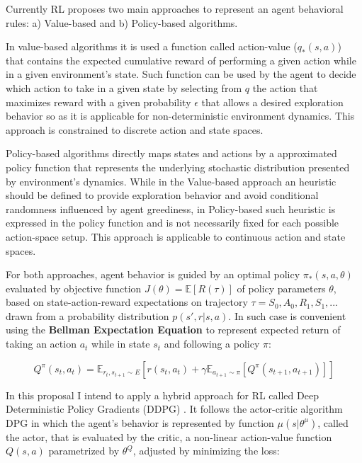 \documentclass[peerreview,onecolumn]{IEEEtran}
\begin{document}
 Currently RL proposes two main approaches to represent an agent behavioral rules: a) Value-based and b) Policy-based algorithms. 
 
 In value-based algorithms it is used a function called action-value ($q_*(s,a)$) that contains the expected cumulative reward of performing a given action while in a given environment's state. Such function can be used by the agent to decide which action to take in a given state by selecting from $q$ the action that maximizes reward with a given probability $\epsilon$ that allows a desired exploration behavior so as it is applicable for non-deterministic environment dynamics. This approach is constrained to discrete action and state spaces.
 
 Policy-based algorithms directly maps states and actions by a approximated policy function that represents the underlying stochastic distribution presented by environment's dynamics. While in the Value-based approach an heuristic should be defined to provide exploration behavior and avoid conditional randomness influenced by agent greediness, in Policy-based such heuristic is expressed in the policy function and is not necessarily fixed for each possible action-space setup. This approach is applicable to continuous action and state spaces.
 
 For both approaches, agent behavior is guided by an optimal policy $\pi_*(s, a, \theta)$ evaluated by objective function $J(\theta)=\mathbb{E}[R(\tau)]$ of policy parameters $\theta$, based on state-action-reward expectations on trajectory $\tau=S_0, A_0, R_1, S_1, ... $ drawn from a probability distribution \textbf{$p(s',r|s, a)$}. In such case is convenient using the \textbf{Bellman Expectation Equation} \cite{bellman_equation} to represent expected return of taking an action $a_t$ while in state $s_t$ and following a policy $\pi$:  
 
 \begin{equation}
 	Q^\pi(s_t, a_t) = \mathbb{E}_{r_t, s_{t+1} \sim E} [r(s_t, a_t) + \gamma\mathbb{E}_{a_{t+1} \sim \pi} [Q^\pi(s_{t+1}, a_{t+1})]]
 \end{equation}
 
 In this proposal I intend to apply a hybrid approach for RL called Deep Deterministic Policy Gradients (DDPG) \cite{ddpg_2015}. It follows the actor-critic \cite{actor_critic_2000} algorithm DPG \cite{silver_2004} in which the agent's behavior is represented by function $\mu(s|\theta^\mu)$, called the actor, that is evaluated by the critic, a non-linear action-value function $Q(s,a)$ parametrized by $\theta^Q$, adjusted by minimizing the loss:
 
\end{document}
